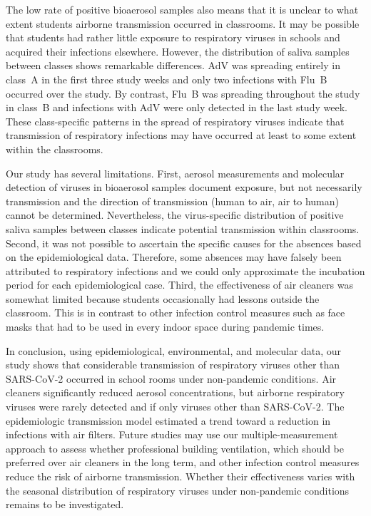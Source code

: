 \documentclass[fleqn,11pt]{wlscirep}
\begin{document}

The low rate of positive bioaerosol samples also means that it is unclear to what extent students airborne transmission occurred in classrooms. It may be possible that students had rather little exposure to respiratory viruses in schools and acquired their infections elsewhere. However, the distribution of saliva samples between classes shows remarkable differences. AdV was spreading entirely in class~A in the first three study weeks and only two infections with Flu~B occurred over the study. By contrast, Flu~B was spreading throughout the study in class~B and infections with AdV were only detected in the last study week. These class-specific patterns in the spread of respiratory viruses indicate that transmission of respiratory infections may have occurred at least to some extent within the classrooms. 



Our study has several limitations. First, aerosol measurements and molecular detection of viruses in bioaerosol samples document exposure, but not necessarily transmission and the direction of transmission (human to air, air to human) cannot be determined. Nevertheless, the virus-specific distribution of positive saliva samples between classes indicate potential transmission within classrooms. Second, it was not possible to ascertain the specific causes for the absences based on the epidemiological data. Therefore, some absences may have falsely been attributed to respiratory infections and we could only approximate the incubation period for each epidemiological case. Third, the effectiveness of air cleaners was somewhat limited because students occasionally had lessons outside the classroom. This is in contrast to other infection control measures such as face masks that had to be used in every indoor space during pandemic times.


In conclusion, using epidemiological, environmental, and molecular data, our study shows that considerable transmission of respiratory viruses other than SARS-CoV-2 occurred in school rooms under non-pandemic conditions. Air cleaners significantly reduced aerosol concentrations, but airborne respiratory viruses were rarely detected and if only viruses other than SARS-CoV-2. The epidemiologic transmission model estimated a trend toward a reduction in infections with air filters. Future studies may use our multiple-measurement approach to assess whether professional building ventilation, which should be preferred over air cleaners in the long term, and other infection control measures reduce the risk of airborne transmission. Whether their effectiveness varies with the seasonal distribution of respiratory viruses under non-pandemic conditions remains to be investigated. 
\end{document}
